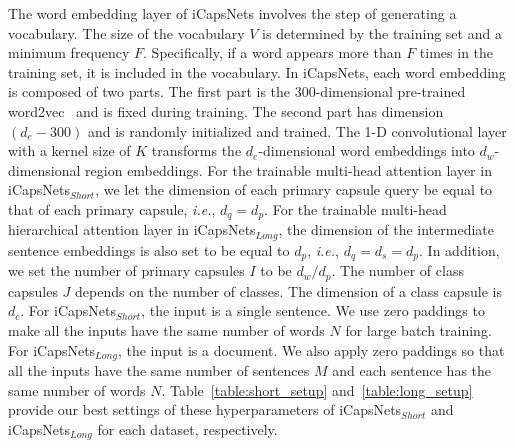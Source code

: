 \documentclass[10pt,journal,compsoc]{IEEEtran}
\begin{document}
The word embedding layer of iCapsNets involves the step of generating a vocabulary. The size of the vocabulary $V$ is determined by the training set and a minimum frequency $F$. Specifically, if a word appears more than $F$ times in the training set, it is included in the vocabulary. In iCapsNets, each word embedding is composed of two parts. The first part is the 300-dimensional pre-trained word2vec~\cite{mikolov2013distributed} and is fixed during training. The second part has dimension $(d_e-300)$ and is randomly initialized and trained. The 1-D convolutional layer with a kernel size of $K$ transforms the $d_e$-dimensional word embeddings into $d_w$-dimensional region embeddings. For the trainable multi-head attention layer in iCapsNets$_{Short}$, we let the dimension of each primary capsule query be equal to that of each primary capsule, \emph{i.e.}, $d_q = d_p$. For the trainable multi-head hierarchical attention layer in iCapsNets$_{Long}$, the dimension of the intermediate sentence embeddings is also set to be equal to $d_p$, \emph{i.e.}, $d_q = d_s = d_p$. In addition, we set the number of primary capsules $I$ to be $d_w / d_p$. The number of class capsules $J$ depends on the number of classes. The dimension of a class capsule is $d_c$. For iCapsNets$_{Short}$, the input is a single sentence. We use zero paddings to make all the inputs have the same number of words $N$ for large batch training. For iCapsNets$_{Long}$, the input is a document. We also apply zero paddings so that all the inputs have the same number of sentences $M$ and each sentence has the same number of words $N$. Table~\ref{table:short_setup} and~\ref{table:long_setup} provide our best settings of these hyperparameters of iCapsNets$_{Short}$ and iCapsNets$_{Long}$ for each dataset, respectively.
\end{document}
